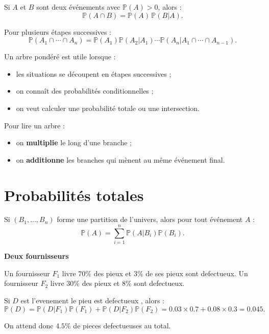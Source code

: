 \begin{Prop}
Si $A$ et $B$ sont deux événements avec $\mathbb{P}(A)>0$, alors :
$$
\mathbb{P}(A\cap B)=\mathbb{P}(A)\,\mathbb{P}(B|A).
$$
\end{Prop}

\begin{Prop}
Pour plusieurs étapes successives :
$$
\mathbb{P}(A_1\cap \cdots \cap A_n)
=\mathbb{P}(A_1)\mathbb{P}(A_2|A_1)\cdots \mathbb{P}(A_n|A_1\cap \cdots \cap A_{n-1}).
$$
\end{Prop}

\begin{Meth}
Un arbre pondéré est utile lorsque :
\begin{itemize}
    \item les situations se découpent en étapes successives ;
    \item on connaît des probabilités conditionnelles ;
    \item on veut calculer une probabilité totale ou une intersection.
\end{itemize}

Pour lire un arbre :
\begin{itemize}
    \item on \textbf{multiplie} le long d'une branche ;
    \item on \textbf{additionne} les branches qui mènent au même événement final.
\end{itemize}
\end{Meth}

\section{Probabilités totales}

\begin{Prop}
Si $(B_1,\dots,B_n)$ forme une partition de l'univers, alors pour tout événement $A$ :
$$
\mathbb{P}(A)=\sum_{i=1}^n \mathbb{P}(A|B_i)\mathbb{P}(B_i).
$$
\end{Prop}

\begin{Ex}
\textbf{Deux fournisseurs}

Un fournisseur $F_1$ livre $70\%$ des pieux et $3\%$ de ses pieux sont defectueux. Un fournisseur $F_2$ livre $30\%$ des pieux et $8\%$ sont defectueux.

Si $D$ est l'evenement \og le pieu est defectueux \fg, alors :
$$
\mathbb{P}(D)=\mathbb{P}(D|F_1)\mathbb{P}(F_1)+\mathbb{P}(D|F_2)\mathbb{P}(F_2)
=0.03\times 0.7 + 0.08\times 0.3 = 0.045.
$$

On attend donc $4.5\%$ de pieces defectueuses au total.
\end{Ex}


